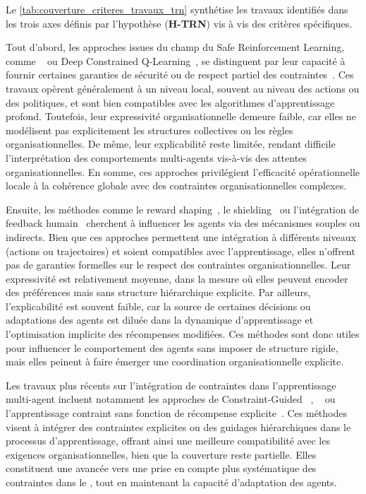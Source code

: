 Le \autoref{tab:couverture_criteres_travaux_trn} synthétise les travaux identifiés dans les trois axes définis par l’hypothèse (\textbf{H-TRN}) vis à vis des critères spécifiques.

Tout d'abord, les approches issues du champ du Safe Reinforcement Learning, comme ~\cite{achiam2017constrained} ou Deep Constrained Q-Learning~\cite{kalweit2020deep}, se distinguent par leur capacité à fournir certaines garanties de sécurité ou de respect partiel des contraintes~\cite{garcia2015comprehensive}. Ces travaux opèrent généralement à un niveau local, souvent au niveau des actions ou des politiques, et sont bien compatibles avec les algorithmes d’apprentissage profond. Toutefois, leur expressivité organisationnelle demeure faible, car elles ne modélisent pas explicitement les structures collectives ou les règles organisationnelles. De même, leur explicabilité reste limitée, rendant difficile l'interprétation des comportements multi-agents vis-à-vis des attentes organisationnelles. En somme, ces approches privilégient l'efficacité opérationnelle locale à la cohérence globale avec des contraintes organisationnelles complexes.

Ensuite, les méthodes comme le reward shaping~\cite{ng1999policy}, le shielding~\cite{amodei2016concrete} ou l’intégration de feedback humain~\cite{warnell2018deep, zhou2025mentor} cherchent à influencer les agents via des mécanismes souples ou indirects. Bien que ces approches permettent une intégration à différents niveaux (actions ou trajectoires) et soient compatibles avec l’apprentissage, elles n’offrent pas de garanties formelles sur le respect des contraintes organisationnelles. Leur expressivité est relativement moyenne, dans la mesure où elles peuvent encoder des préférences mais sans structure hiérarchique explicite. Par ailleurs, l’explicabilité est souvent faible, car la source de certaines décisions ou adaptations des agents est diluée dans la dynamique d’apprentissage et l’optimisation implicite des récompenses modifiées. Ces méthodes sont donc utiles pour influencer le comportement des agents sans imposer de structure rigide, mais elles peinent à faire émerger une coordination organisationnelle explicite.

Les travaux plus récents sur l’intégration de contraintes dans l’apprentissage multi-agent incluent notamment les approches de Constraint-Guided ~\cite{spieker2021constraint}, ~\cite{zhou2025mentor} ou l’apprentissage contraint sans fonction de récompense explicite~\cite{miryoosefi2022}. Ces méthodes visent à intégrer des contraintes explicites ou des guidages hiérarchiques dans le processus d’apprentissage, offrant ainsi une meilleure compatibilité avec les exigences organisationnelles, bien que la couverture reste partielle. Elles constituent une avancée vers une prise en compte plus systématique des contraintes dans le , tout en maintenant la capacité d’adaptation des agents.

